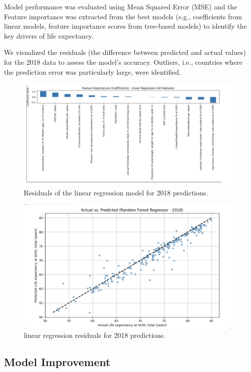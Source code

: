 \documentclass{article}
\begin{document}
Model performance was evaluated using Mean Squared Error (MSE) and the Feature importance was extracted from the best models (e.g., coefficients from linear models, feature importance scores from tree-based models) to identify the key drivers of life expectancy.



We visualized the residuals (the difference between predicted and actual values) for the 2018 data to assess the model's accuracy. Outliers, i.e., countries where the prediction error was particularly large, were identified.
\begin{figure}[h]
    \centering
    \includegraphics[width=0.8\columnwidth]{./pic/T1.b.1.png} %
    \caption{Residuals of the linear regression model for 2018 predictions.}
    \label{fig:correlation_heatmap}
\end{figure}

\begin{figure}[h]
    \centering
    \includegraphics[width=0.8\columnwidth]{./pic/T1.b.2.png} %
    \caption{linear regression residuals for 2018 predictions.}
    \label{fig:correlation_heatmap}
\end{figure}

\subsection{Model Improvement}
\label{ssec:model_improvement}
\end{document}
